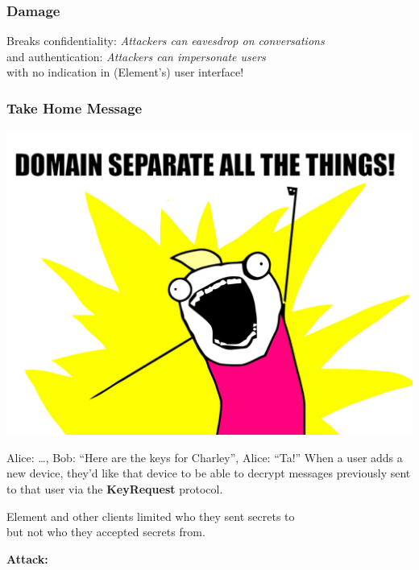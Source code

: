 \documentclass[aspectratio=169]{beamer}
\begin{document}
\begin{frame}[allowframebreaks]
\end{frame}

\begin{frame}
  \frametitle{Damage}
  Breaks confidentiality: \emph{Attackers can eavesdrop on conversations} \\
  \vspace{1em}
  \hspace{1em} and authentication: \emph{Attackers can impersonate users} \\
  \vspace{1em}
  with \alert{no indication} in (Element's) user interface!
\end{frame}

\begin{frame}
  \frametitle{Take Home Message}

  \centering
  \includegraphics[height=1.0\textheight]{./all-the-things.jpg}

\end{frame}

\begin{frame}{Alice: \dots, Bob: ``Here are the keys for Charley'', Alice: ``Ta!''}
  When a user adds a new device, they'd like that device to be able to decrypt messages previously sent to that user via the \textbf{KeyRequest} protocol.

  Element and other clients limited who they sent secrets \alert{to} \\
  but not who they accepted secrets \alert{from}.

  \textbf{Attack:}

  \centering\scalebox{0.75}{}

\end{frame}
\end{document}
